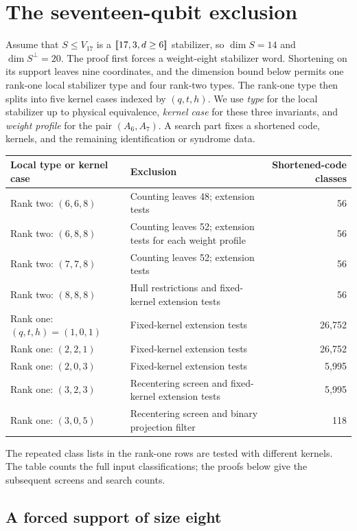 \section{The seventeen-qubit exclusion}\label{sec:seventeen}

Assume that \(S\leq V_{17}\) is a \([\![17,3,d\geq6]\!]\)
stabilizer, so \(\dim S=14\) and \(\dim S^\perp=20\).
The proof first forces a weight-eight stabilizer word. Shortening on its
support leaves nine coordinates, and the dimension bound below permits
one rank-one local stabilizer type and four rank-two types. The rank-one
type then splits into five kernel cases indexed by \((q,t,h)\).
We use \emph{type} for the local stabilizer up to physical equivalence,
\emph{kernel case} for these three invariants, and \emph{weight profile}
for the pair \((A_6,A_7)\). A search part fixes a shortened code, kernels,
and the remaining identification or syndrome data.

\begin{center}\small
\begin{tabularx}{\linewidth}{@{}lXr@{}}\toprule
Local type or kernel case&Exclusion&Shortened-code classes\\\midrule
Rank two: \((6,6,8)\)&Counting leaves 48; extension tests&56\\
Rank two: \((6,8,8)\)&Counting leaves 52; extension tests for each weight profile&56\\
Rank two: \((7,7,8)\)&Counting leaves 52; extension tests&56\\
Rank two: \((8,8,8)\)&Hull restrictions and fixed-kernel extension tests&56\\
Rank one: \((q,t,h)=(1,0,1)\)&Fixed-kernel extension tests&26,752\\
Rank one: \((2,2,1)\)&Fixed-kernel extension tests&26,752\\
Rank one: \((2,0,3)\)&Fixed-kernel extension tests&5,995\\
Rank one: \((3,2,3)\)&Recentering screen and fixed-kernel extension tests&5,995\\
Rank one: \((3,0,5)\)&Recentering screen and binary projection filter&118\\\bottomrule
\end{tabularx}
\end{center}
The repeated class lists in the rank-one rows are tested with different
kernels. The table counts the full input classifications; the proofs
below give the subsequent screens and search counts.

\subsection{A forced support of size eight}

